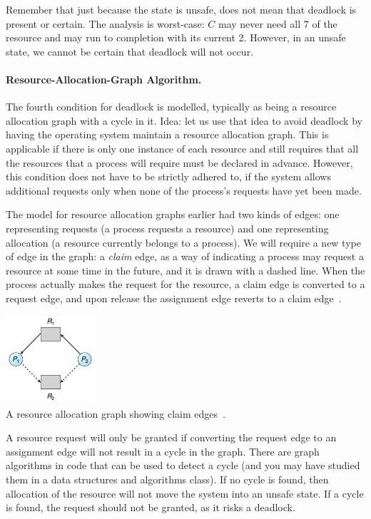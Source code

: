 \documentclass[a4paper]{report}
\begin{document}
Remember that just because the state is unsafe, does not mean that deadlock is present or certain. The analysis is worst-case: $C$ may never need all 7 of the resource and may run to completion with its current 2. However, in an unsafe state, we cannot be certain that deadlock will not occur.

\paragraph{Resource-Allocation-Graph Algorithm.} The fourth condition for deadlock is modelled, typically as being a resource allocation graph with a cycle in it. Idea: let us use that idea to avoid deadlock by having the operating system maintain a resource allocation graph. This is applicable if there is only one instance of each resource and still requires that all the resources that a process will require must be declared in advance. However, this condition does not have to be strictly adhered to, if the system allows additional requests only when none of the process's requests have yet been made.

The model for resource allocation graphs earlier had two kinds of edges: one representing requests (a process requests a resource) and one representing allocation (a resource currently belongs to a process). We will require a new type of edge in the graph: a \textit{claim} edge, as a way of indicating a process may request a resource at some time in the future, and it is drawn with a dashed line. When the process actually makes the request for the resource, a claim edge is converted to a request edge, and upon release the assignment edge reverts to a claim edge~\cite{osc}.

\begin{center}
	\includegraphics[width=0.25\textwidth]{images/resource-allocation-graph-claim.png}\\
	A resource allocation graph showing claim edges~\cite{osc}.
\end{center}

A resource request will only be granted if converting the request edge to an assignment edge will not result in a cycle in the graph. There are graph algorithms in code that can be used to detect a cycle (and you may have studied them in a data structures and algorithms class). If no cycle is found, then allocation of the resource will not move the system into an unsafe state. If a cycle is found, the request should not be granted, as it risks a deadlock.
\end{document}
